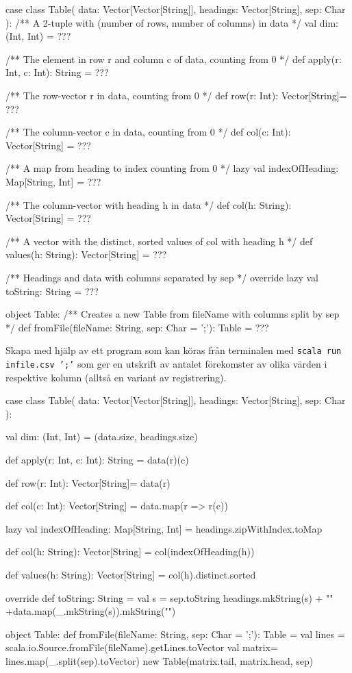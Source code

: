 \begin{CodeSmall}
case class Table(
  data: Vector[Vector[String]],
  headings: Vector[String],
  sep: Char
):
  /** A 2-tuple with (number of rows, number of columns) in data */
  val dim: (Int, Int) = ???

  /** The element in row r and column c of data, counting from 0 */
  def apply(r: Int, c: Int): String = ???

  /** The row-vector r in data, counting from 0 */
  def row(r: Int): Vector[String]= ???

  /** The column-vector c in data, counting from 0 */
  def col(c: Int): Vector[String] = ???

  /** A map from heading to index counting from 0 */
  lazy val indexOfHeading: Map[String, Int] = ???

  /** The column-vector with heading h in data */
  def col(h: String): Vector[String] = ???

  /** A vector with the distinct, sorted values of col with heading h */
  def values(h: String): Vector[String] = ???

  /** Headings and data with columns separated by sep */
  override lazy val toString: String = ???

object Table:
  /** Creates a new Table from fileName with columns split by sep */
  def fromFile(fileName: String, sep: Char = ';'): Table = ???
\end{CodeSmall}

\Subtask Skapa med hjälp av  ett program som kan köras från terminalen med \texttt{scala run infile.csv ';'} som ger en utskrift av antalet förekomster av olika värden i respektive kolumn (alltså en variant av registrering).



\SOLUTION

\TaskSolved \what

\SubtaskSolved  \begin{CodeSmall}
case class Table(
  data: Vector[Vector[String]],
  headings: Vector[String],
  sep: Char
):

  val dim: (Int, Int) = (data.size, headings.size)

  def apply(r: Int, c: Int): String = data(r)(c)

  def row(r: Int): Vector[String]= data(r)

  def col(c: Int): Vector[String] = data.map(r => r(c))

  lazy val indexOfHeading: Map[String, Int] = headings.zipWithIndex.toMap

  def col(h: String): Vector[String] = col(indexOfHeading(h))

  def values(h: String): Vector[String] = col(h).distinct.sorted

  override def toString: String =
    val s = sep.toString
    headings.mkString(s) + "\n" +data.map(_.mkString(s)).mkString("\n")

object Table:
  def fromFile(fileName: String, sep: Char = ';'): Table = 
    val lines = scala.io.Source.fromFile(fileName).getLines.toVector
    val matrix= lines.map(_.split(sep).toVector)
    new Table(matrix.tail, matrix.head, sep)
\end{CodeSmall}

